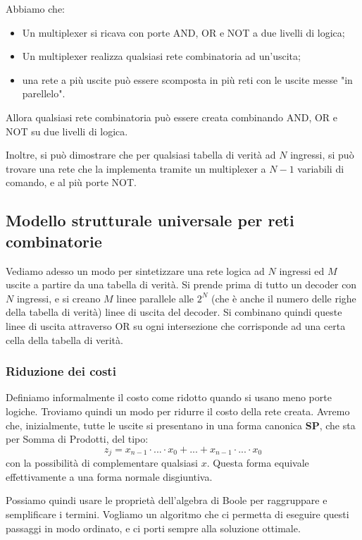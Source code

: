 \documentclass[a4paper,11pt]{article}
\begin{document}
Abbiamo che:
\begin{itemize}
	\item Un multiplexer si ricava con porte AND, OR e NOT a due livelli di logica; 
	\item Un multiplexer realizza qualsiasi rete combinatoria ad un'uscita;
	\item una rete a più uscite può essere scomposta in più reti con le uscite messe "in parellelo".
\end{itemize}
Allora qualsiasi rete combinatoria può essere creata combinando AND, OR e NOT su due livelli di logica.

Inoltre, si può dimostrare che per qualsiasi tabella di verità ad $N$ ingressi, si può trovare una rete che la implementa tramite un multiplexer a $N-1$ variabili di comando, e al più porte NOT.

\subsection{Modello strutturale universale per reti combinatorie}
Vediamo adesso un modo per sintetizzare una rete logica ad $N$ ingressi ed $M$ uscite a partire da una tabella di verità.
Si prende prima di tutto un decoder con $N$ ingressi, e si creano $M$ linee parallele alle $2^N$ (che è anche il numero delle righe della tabella di verità) linee di uscita del decoder.
Si combinano quindi queste linee di uscita attraverso OR su ogni intersezione che corrisponde ad una certa cella della tabella di verità.

\subsubsection{Riduzione dei costi}
Definiamo informalmente il costo come ridotto quando si usano meno porte logiche.
Troviamo quindi un modo per ridurre il costo della rete creata.
Avremo che, inizialmente, tutte le uscite si presentano in una forma canonica \textbf{SP}, che sta per Somma di Prodotti, del tipo:
$$ 
z_j = x_{n-1} \cdot ... \cdot x_0 + ... + x_{n-1} \cdot ... \cdot x_0
$$
con la possibilità di complementare qualsiasi $x$. 
Questa forma equivale effettivamente a una forma normale disgiuntiva.

Possiamo quindi usare le proprietà dell'algebra di Boole per raggruppare e semplificare i termini.
Vogliamo un algoritmo che ci permetta di eseguire questi passaggi in modo ordinato, e ci porti sempre alla soluzione ottimale.
\end{document}

